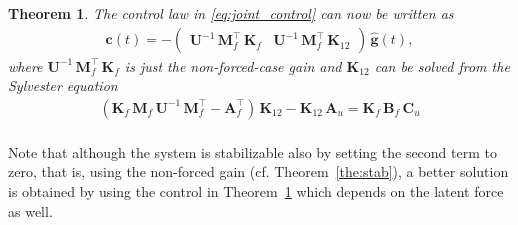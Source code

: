 \documentclass[journal]{IEEEtran}
\newtheorem{theorem}{Theorem}[section]
\begin{document}
\begin{theorem} \label{the:control}
The control law in \eqref{eq:joint_control} can now be written as
%
\begin{equation} 
\begin{split}
  \mathbf{c}(t) = - \begin{pmatrix}
    \mathbf{U}^{-1} \, \mathbf{M}_f^{\top} \, \mathbf{K}_{f} &
    \mathbf{U}^{-1} \, \mathbf{M}_f^{\top} \, \mathbf{K}_{12}
  \end{pmatrix} \, \hat{\mathbf{g}}(t),
\end{split}
\label{eq:joint_control2}
\end{equation}
%
where $\mathbf{U}^{-1} \, \mathbf{M}_f^{\top} \, \mathbf{K}_{f}$ is just the non-forced-case gain and $\mathbf{K}_{12}$ can be solved from the Sylvester equation
%
\begin{equation}
\begin{split}
  \left( \mathbf{K}_{f} \, \mathbf{M}_f \, \mathbf{U}^{-1} \, \mathbf{M}_f^{\top} 
         - \mathbf{A}_f^{\top} \right) \, \mathbf{K}_{12}  - \mathbf{K}_{12} \, \mathbf{A}_u
    = \mathbf{K}_{f} \, \mathbf{B}_f \, \mathbf{C}_u \\
\end{split}
\end{equation}
\end{theorem}
%
Note that although the system is stabilizable also by setting the second term to zero, that is, using the non-forced gain (cf. Theorem~\ref{the:stab}), a better solution is obtained by using the control in Theorem~\ref{the:control} which depends on the latent force as well.
\end{document}

